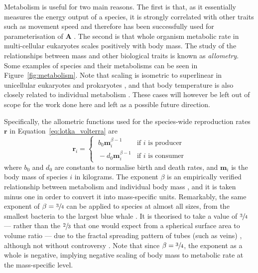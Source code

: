 Metabolism is useful for two main reasons. The first is that, as it essentially measures the energy output of a species, it is strongly correlated with other traits such as movement speed \cite{Hirt2017} and therefore has been successfully used for parameterisation of $\mathbf{A}$ \cite{Tang2014Correlation, Brose2006, Pawar2015}.
The second is that whole organism metabolic rate in multi-cellular eukaryotes scales positively with body mass.
The study of the relationships between mass and other biological traits is known as \emph{allometry}. Some examples of species and their metabolisms can be seen in Figure~\ref{fig:metabolism}.
Note that scaling is isometric to superlinear in unicellular eukaryotes and prokaryotes \cite{DeLong2010}, and that body temperature is also closely related to individual metabolism \cite{Savage2004}. These cases will however be left out of scope for the work done here and left as a possible future direction.

Specifically, the allometric functions used for the species-wide reproduction rates $\mathbf{r}$ in Equation~\eqref{eq:lotka_volterra} are
\begin{equation}
  \mathbf{r}_i =
  \begin{cases}
    \;b_0\mathbf{m}_i^{\beta-1} & \text{if $i$ is producer}\\
    \;-d_0\mathbf{m}_i^{\beta-1} & \text{if $i$ is consumer}
  \end{cases}
  \label{eq:metabolism_beta}
\end{equation}
where $b_0$ and $d_0$ are constants to normalise birth and death rates, and $\mathbf{m}_i$ is the body mass of species $i$ in kilograms. The exponent $\beta$ is an empirically verified relationship between metabolism and individual body mass \cite{Brown2004}, and it is taken minus one in order to convert it into mass-specific units.
Remarkably, the same exponent of $\beta=\sfrac{3}{4}$ can be applied to species at almost all sizes, from the smallest bacteria to the largest blue whale \cite{Kleiber1947}. It is theorised to take a value of $\sfrac{3}{4}$ --- rather than the $\sfrac{2}{3}$ that one would expect from a spherical surface area to volume ratio --- due to the fractal spreading pattern of tubes (such as veins) \cite{West1997}, although not without controversy \cite{Agutter2004}.
Note that since $\beta=\sfrac{3}{4}$, the exponent as a whole is negative, implying negative scaling of body mass to metabolic rate at the mass-specific level.

